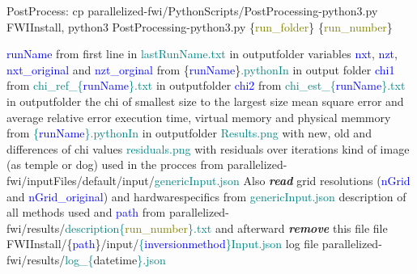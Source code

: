 \documentclass{article}
\begin{document}
\begin{algorithm}
\caption{PostProcess: cp  parallelized-fwi/PythonScripts/PostProcessing-python3.py FWIInstall, python3 PostProcessing-python3.py \{\textcolor{olive}{run\_folder}\} \{\textcolor{olive}{run\_number}\}}
\begin{algorithmic}
 \textcolor{blue}{runName} from first line in \textcolor{teal}{lastRunName.txt} in outputfolder
 variables \textcolor{blue}{nxt}, \textcolor{blue}{nzt}, \textcolor{blue}{nxt\_original} and \textcolor{blue}{nzt\_orginal} from \{\textcolor{blue}{runName}\}\textcolor{teal}{.pythonIn} in output folder
 \textcolor{blue}{chi1} from \textcolor{teal}{chi\_ref\_\{}\textcolor{blue}{runName}\textcolor{teal}{\}.txt} in outputfolder
 \textcolor{blue}{chi2} from \textcolor{teal}{chi\_est\_\{}\textcolor{blue}{runName}\textcolor{teal}{\}.txt} in outputfolder
 the chi of smallest size to the largest size
 mean square error and average relative error
 execution time, virtual memory and physical memmory from \textcolor{teal}{\{}\textcolor{blue}{runName}\textcolor{teal}{\}.pythonIn} in outputfolder
 \textcolor{teal}{Results.png} with new, old and differences of chi values
 \textcolor{teal}{residuals.png} with residuals over iterations
 
 { }
 kind of image (as temple or dog) used in the procces \State from parallelized-fwi/inputFiles/default/input/\textcolor{teal}{genericInput.json}
\State Also {\bf \emph {read}} grid resolutions (\textcolor{blue}{nGrid} and \textcolor{blue}{nGrid\_original}) and hardwarespecifics from \textcolor{teal}{genericInput.json}
 description of all methods used and \textcolor{blue}{path} from parallelized-fwi/results/\textcolor{teal}{description\{}\textcolor{olive}{run\_number}\textcolor{teal}{\}.txt} \State and afterward {\bf \emph {remove}} this file
 file FWIInstall/\{\textcolor{blue}{path}\}/input/\textcolor{teal}{\{}\textcolor{blue}{inversionmethod}\textcolor{teal}{\}Input.json}
\EndProcedure
{} { }
\EndIf
{} log file parallelized-fwi/results/\textcolor{teal}{log\_\{}datetime\textcolor{teal}{\}.json}
\EndProcedure
\EndProcedure
\end{algorithmic}
\end{algorithm}
\end{document}
